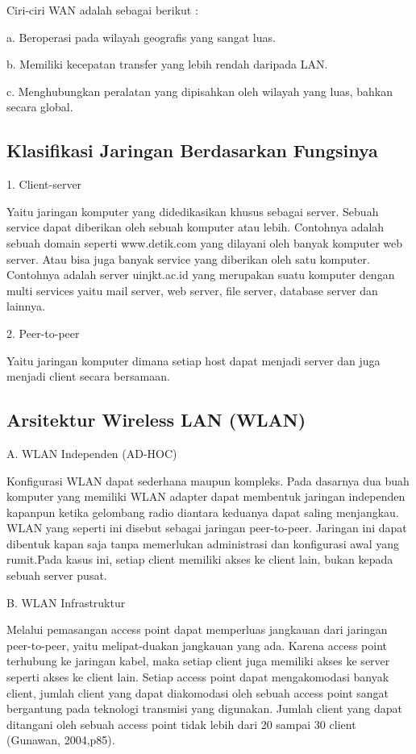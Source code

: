 \documentclass{jtetiproposalskripsi}
\begin{document}
Ciri-ciri WAN adalah sebagai berikut :

a. Beroperasi pada wilayah geografis yang sangat luas.

b. Memiliki kecepatan transfer yang lebih rendah daripada LAN.

c. Menghubungkan peralatan yang dipisahkan oleh wilayah yang
   luas, bahkan secara global.


\subsection{Klasifikasi Jaringan Berdasarkan Fungsinya}
1. Client-server

	Yaitu jaringan komputer yang didedikasikan khusus sebagai server. Sebuah service dapat diberikan oleh sebuah komputer atau 
lebih. Contohnya adalah sebuah domain seperti www.detik.com yang dilayani oleh banyak komputer web server. Atau bisa juga banyak service yang diberikan oleh satu komputer. Contohnya adalah server uinjkt.ac.id yang merupakan suatu komputer dengan multi services yaitu mail server, web server, file server, database server dan lainnya.


2. Peer-to-peer


	Yaitu jaringan komputer dimana setiap host dapat menjadi server dan juga menjadi client secara bersamaan.


\subsection{Arsitektur Wireless LAN (WLAN)}
A. WLAN Independen (AD-HOC)


	Konfigurasi WLAN dapat sederhana maupun kompleks. Pada dasarnya dua buah komputer yang memiliki WLAN adapter dapat membentuk jaringan independen kapanpun ketika gelombang radio diantara keduanya dapat saling menjangkau. WLAN yang seperti ini disebut sebagai jaringan peer-to-peer. Jaringan ini dapat dibentuk kapan saja tanpa memerlukan administrasi dan konfigurasi awal yang rumit.Pada kasus ini, setiap client memiliki akses ke client lain, bukan kepada sebuah server pusat.

B. WLAN Infrastruktur

	Melalui pemasangan access point dapat memperluas jangkauan dari jaringan peer-to-peer, yaitu melipat-duakan jangkauan yang ada. Karena access point terhubung ke jaringan kabel, maka setiap client juga memiliki akses ke server seperti akses ke client lain. Setiap access point dapat mengakomodasi banyak client, jumlah client yang dapat diakomodasi oleh sebuah access point sangat bergantung pada teknologi transmisi yang digunakan. Jumlah client yang dapat ditangani oleh sebuah access point tidak lebih dari 20 sampai 30 client (Gunawan, 2004,p85).
\end{document}
